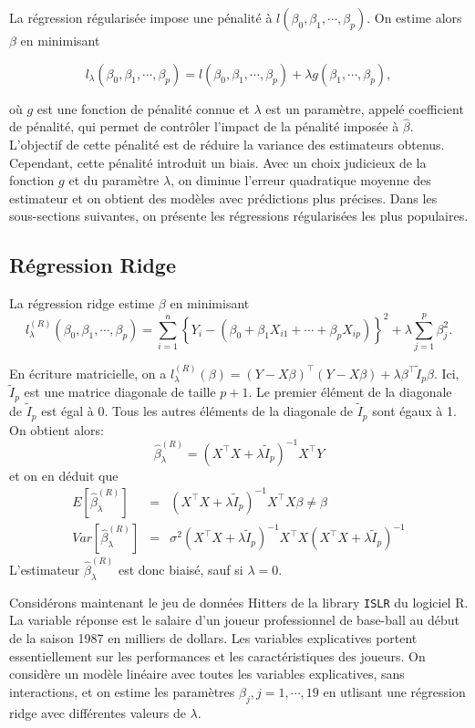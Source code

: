 \documentclass[11pt]{article}
\begin{document}
\noindent La r\'egression r\'egularis\'ee impose une p\'enalit\'e \`a $l(\beta_0,\beta_1,\cdots,\beta_p)$. On estime alors $\beta$ en minimisant

$$l_\lambda(\beta_0,\beta_1,\cdots,\beta_p) = l(\beta_0,\beta_1,\cdots,\beta_p) + \lambda g(\beta_1,\cdots,\beta_p),$$

\noindent o\`u $g$ est une fonction de p\'enalit\'e connue et $\lambda$ est un param\`etre, appel\'e coefficient de p\'enalit\'e, qui permet de contr\^oler l'impact de la p\'enalit\'e impos\'ee \`a $\hat\beta$. L'objectif de cette p\'enalit\'e est de r\'eduire la variance des estimateurs obtenus. Cependant, cette p\'enalit\'e introduit un biais. Avec un choix judicieux de la fonction $g$ et du param\`etre $\lambda$, on diminue l'erreur quadratique moyenne des estimateur et on obtient des mod\`eles avec pr\'edictions plus pr\'ecises. Dans les sous-sections suivantes, on pr\'esente les r\'egressions r\'egularis\'ees les plus populaires.



\subsection{R\'egression Ridge}


\noindent La r\'egression ridge estime $\beta$ en minimisant
$$l^{(R)}_\lambda(\beta_0,\beta_1,\cdots,\beta_p) = \sum_{i=1}^n \left\{Y_i - (\beta_0 + \beta_1 X_{i1} + \cdots  + \beta_p X_{ip})\right\}^2 + \lambda \sum_{j=1}^p \beta_j^2.$$

\noindent En \'ecriture matricielle, on a $l^{(R)}_\lambda(\beta)=(Y-X\beta)^\top(Y-X\beta) + \lambda \beta^\top \tilde I_p \beta$. Ici, $\tilde I_p$ est une matrice diagonale de taille $p+1$. Le premier \'el\'ement de la diagonale de $\tilde I_p$ est \'egal \`a 0. Tous les autres \'el\'ements de la diagonale de $\tilde I_p$ sont \'egaux \`a 1. On obtient alors:
$$\hat\beta^{(R)}_{\lambda} = (X^\top X + \lambda \tilde I_p)^{-1} X^\top Y$$
\noindent et on en d\'eduit que
\begin{eqnarray*}
E[\hat\beta^{(R)}_{\lambda}] &=& (X^\top X + \lambda \tilde I_p)^{-1} X^\top X \beta  \neq \beta\\
Var[\hat\beta^{(R)}_{\lambda}] &=&  \sigma^2 (X^\top X + \lambda \tilde I_p)^{-1} X^\top X (X^\top X + \lambda \tilde I_p)^{-1}
\end{eqnarray*}
\noindent L'estimateur $\hat\beta^{(R)}_{\lambda}$ est donc biais\'e, sauf si $\lambda=0$. 

\noindent Consid\'erons maintenant le jeu de donn\'ees \textsf{Hitters} de la library \texttt{ISLR} du logiciel \textrm{R}. La variable r\'eponse est le salaire d'un joueur professionnel de base-ball au d\'ebut de la saison 1987 en milliers de dollars. Les variables explicatives portent essentiellement sur les performances et les caract\'eristiques des joueurs. On consid\`ere un mod\`ele lin\'eaire avec toutes les variables explicatives, sans interactions, et on estime les param\`etres $\beta_j, j=1,\cdots,19$  en utlisant une r\'egression ridge avec diff\'erentes valeurs de $\lambda$.
\end{document}
